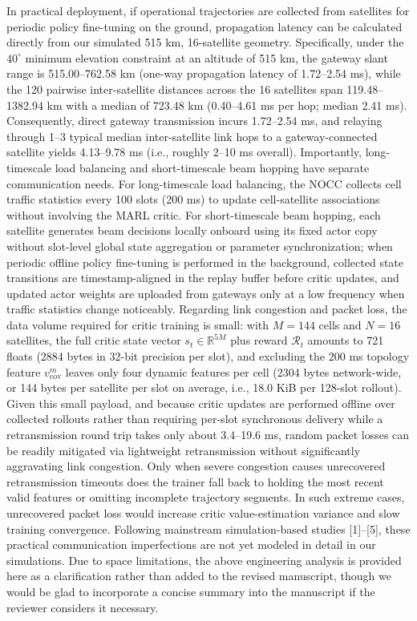 \documentclass[11pt,a4paper]{article}
\newcommand{\qrev}[1]{{\color{qinrev}#1}}
\begin{document}
In practical deployment, if operational trajectories are collected from satellites for periodic policy fine-tuning on the ground, propagation latency can be calculated directly from our simulated 515 km, 16-satellite geometry. Specifically, under the $40^\circ$ minimum elevation constraint at an altitude of 515 km, the gateway slant range is 515.00--762.58 km (one-way propagation latency of 1.72--2.54 ms), while the 120 pairwise inter-satellite distances across the 16 satellites span 119.48--1382.94 km with a median of 723.48 km (0.40--4.61 ms per hop; median 2.41 ms). Consequently, direct gateway transmission incurs 1.72--2.54 ms, and relaying through 1--3 typical median inter-satellite link hops to a gateway-connected satellite yields 4.13--9.78 ms (i.e., roughly 2--10 ms overall). Importantly, long-timescale load balancing and short-timescale beam hopping have separate communication needs. For long-timescale load balancing, the NOCC collects cell traffic statistics every 100 slots (200 ms) to update cell-satellite associations without involving the MARL critic. For short-timescale beam hopping, each satellite generates beam decisions locally onboard using its fixed actor copy without slot-level global state aggregation or parameter synchronization; when periodic offline policy fine-tuning is performed in the background, collected state transitions are timestamp-aligned in the replay buffer before critic updates, and updated actor weights are uploaded from gateways only at a low frequency when traffic statistics change noticeably. Regarding link congestion and packet loss, the data volume required for critic training is small: with $M=144$ cells and $N=16$ satellites, the full \qrev{critic state vector} $s_t\in\mathbb{R}^{5M}$ plus reward $\mathcal{R}_t$ amounts to 721 floats (2884 bytes in 32-bit precision per slot), and excluding the 200 ms topology feature $v_{\mathrm{cov}}^m$ leaves only four dynamic features per cell (2304 bytes network-wide, or 144 bytes per satellite per slot on average, i.e., 18.0 KiB per 128-slot rollout). Given this small payload, and because critic updates are performed offline over collected rollouts rather than requiring per-slot synchronous delivery while a retransmission round trip takes only about 3.4--19.6 ms, random packet losses can be readily mitigated via lightweight retransmission without \qrev{significantly aggravating link congestion}. \qrev{Only when severe congestion causes unrecovered retransmission timeouts does the trainer fall back to holding the most recent valid features or omitting incomplete trajectory segments. In such extreme cases, unrecovered packet loss would increase critic value-estimation variance and slow training convergence. Following mainstream simulation-based studies [1]--[5], these practical communication imperfections are not yet modeled in detail in our simulations. Due to space limitations, the above engineering analysis is provided here as a clarification rather than added to the revised manuscript, though we would be glad to incorporate a concise summary into the manuscript if the reviewer considers it necessary.}
\par
\end{document}
